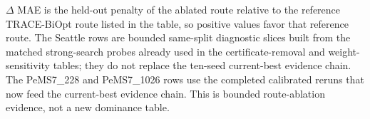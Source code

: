 \begin{table}[pos=htbp]
{\begin{tabular}
\bottomrule
\end{tabular}
}
\begin{flushleft}\footnotesize $\Delta$ MAE is the held-out penalty of the ablated route relative to the reference TRACE-BiOpt route listed in the table, so positive values favor that reference route. The Seattle rows are bounded same-split diagnostic slices built from the matched strong-search probes already used in the certificate-removal and weight-sensitivity tables; they do not replace the ten-seed current-best evidence chain. The PeMS7\_228 and PeMS7\_1026 rows use the completed calibrated reruns that now feed the current-best evidence chain. This is bounded route-ablation evidence, not a new dominance table.\end{flushleft}
\end{table}
